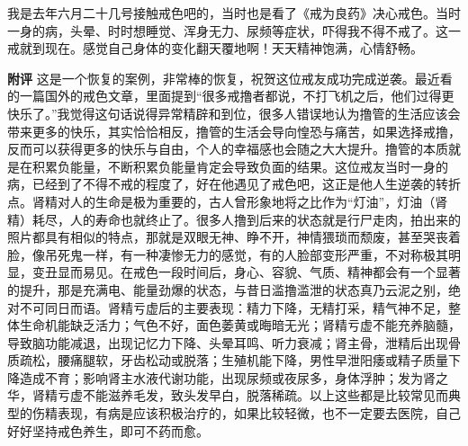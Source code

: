 \begin{case}
    我是去年六月二十几号接触戒色吧的，当时也是看了《戒为良药》决心戒色。当时一身的病，头晕、时时想睡觉、浑身无力、尿频等症状，吓得我不得不戒了。这一戒就到现在。感觉自己身体的变化翻天覆地啊！天天精神饱满，心情舒畅。

    \textbf{附评} 这是一个恢复的案例，非常棒的恢复，祝贺这位戒友成功完成逆袭。最近看的一篇国外的戒色文章，里面提到“很多戒撸者都说，不打飞机之后，他们过得更快乐了。”我觉得这句话说得异常精辟和到位，很多人错误地认为撸管的生活应该会带来更多的快乐，其实恰恰相反，撸管的生活会导向惶恐与痛苦，如果选择戒撸，反而可以获得更多的快乐与自由，个人的幸福感也会随之大大提升。撸管的本质就是在积累负能量，不断积累负能量肯定会导致负面的结果。这位戒友当时一身的病，已经到了不得不戒的程度了，好在他遇见了戒色吧，这正是他人生逆袭的转折点。肾精对人的生命是极为重要的，古人曾形象地将之比作为“灯油”，灯油（肾精）耗尽，人的寿命也就终止了。很多人撸到后来的状态就是行尸走肉，拍出来的照片都具有相似的特点，那就是双眼无神、睁不开，神情猥琐而颓废，甚至哭丧着脸，像吊死鬼一样，有一种凄惨无力的感觉，有的人脸部变形严重，不对称极其明显，变丑显而易见。在戒色一段时间后，身心、容貌、气质、精神都会有一个显著的提升，那是充满电、能量劲爆的状态，与昔日滥撸滥泄的状态真乃云泥之别，绝对不可同日而语。肾精亏虚后的主要表现：精力下降，无精打采，精气神不足，整体生命机能缺乏活力；气色不好，面色萎黄或晦暗无光；肾精亏虚不能充养脑髓，导致脑功能减退，出现记忆力下降、头晕耳鸣、听力衰减；肾主骨，泄精后出现骨质疏松，腰痛腿软，牙齿松动或脱落；生殖机能下降，男性早泄阳痿或精子质量下降造成不育；影响肾主水液代谢功能，出现尿频或夜尿多，身体浮肿；发为肾之华，肾精亏虚不能滋养毛发，致头发早白，脱落稀疏。以上这些都是比较常见而典型的伤精表现，有病是应该积极治疗的，如果比较轻微，也不一定要去医院，自己好好坚持戒色养生，即可不药而愈。
\end{case}

